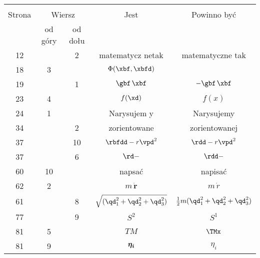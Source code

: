 \documentclass[a4paper,11pt]{article}
\begin{document}
\vspace{\spaceTwo}




\begin{center}
  \begin{tabular}{|c|c|c|c|c|}
    \hline
    & \multicolumn{2}{c|}{} & & \\
    Strona & \multicolumn{2}{c|}{Wiersz} & Jest
                              & Powinno być \\ \cline{2-3}
    & od góry & od dołu & & \\
    \hline
    12  & &  2 & matematycz netak & matematyczne tak \\
    18  &  3 & & $\Phi( \xbf, \xbfd )$
           & %
    \\
    19  & &  1 & $\gbf\, \xbf$ & $- \gbf\, \xbf$ \\
    23  &  4 & & $f( \xd )$ & $f( x )$ \\
    24  &  1 & & Narysujem y & Narysujemy \\
    34  & &  2 & zorientowane & zorientowanej \\
    37  & & 10 & $\rbfdd - r \vpd^{ 2 }$ & $\rdd - r \vpd^{ 2 }$ \\
    37  & &  6 & $\rd -$ & $\rdd -$ \\
    60  & 10 & & napsać & napisać \\
    62  &  2 & & $m\, \dot{ \mathbf{r} }$ & $m\, \dot{ r }$ \\
    61  & &  8 & $\sqrt{ ( \qd_{ 1 }^{ 2 } + \qd_{ 2 }^{ 2 }
                 + \qd_{ 3 }^{ 2 } ) }$
           & $\frac{ 1 }{ 2 } m ( \qd_{ 1 }^{ 2 } + \qd_{ 2 }^{ 2 }
             + \qd_{ 3 }^{ 2 } )$ \\
    77  & &  9 & $S^{ 2 }$ & $S^{ 1 }$ \\
    81  &  5 & & $TM$ & $\TMx$ \\
    81  &  9 & & $\boldsymbol{ \eta_{ i } }$ & $\eta_{ i }$ \\

\end{tabular}
\end{center}
\end{document}
